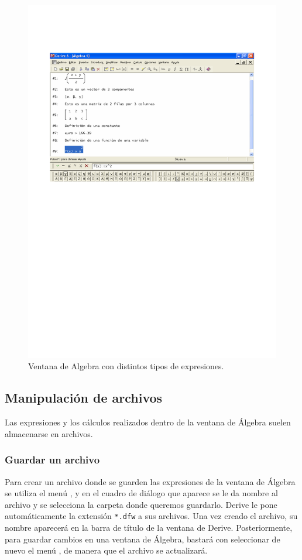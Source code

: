 \begin{figure}[h!]
\begin{center}
\includegraphics[scale=0.6]{img/introduccion_derive/expresiones}
\caption{Ventana de Algebra con distintos tipos de expresiones.}
\label{g:expresiones}
\end{center}
\end{figure}


\subsection*{Manipulación de archivos}
Las expresiones y los cálculos realizados dentro de la ventana de
Álgebra suelen almacenarse en archivos.

\subsubsection*{Guardar un archivo}
Para crear un archivo donde se guarden las expresiones de la ventana
de Álgebra se utiliza el menú , y en el
cuadro de diálogo que aparece se le da nombre al archivo y se
selecciona la carpeta donde queremos guardarlo. Derive le pone
automáticamente la extensión \texttt{*.dfw} a sus archivos. Una vez
creado el archivo, su nombre aparecerá en la barra de título de la
ventana de Derive. Posteriormente, para guardar cambios en una
ventana de Álgebra, bastará con seleccionar de nuevo el menú
, de manera que el archivo se actualizará.

